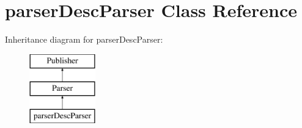 \hypertarget{classparser_desc_parser}{\section{parser\-Desc\-Parser \-Class \-Reference}
\label{classparser_desc_parser}
}
\-Inheritance diagram for parser\-Desc\-Parser\-:\begin{figure}[H]
\begin{center}
\leavevmode
\includegraphics[height=3.000000cm]{classparser_desc_parser}
\end{center}
\end{figure}
